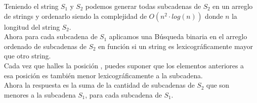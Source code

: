 
Teniendo el string $S_1$ y $S_2$ podemos generar todas subcadenas de $S_2$ en un arreglo de strings y ordenarlo siendo la complejidad de $O(n^2 \cdot log(n))$ donde $n$ la longitud del string $S_2$.\\

Ahora para cada subcadena de $S_1$ aplicamos una Búsqueda binaria en el arreglo ordenado de subcadenas de $S_2$ en función si un string es lexicográficamente mayor que otro string.\\

Cada vez que halles la posición , puedes suponer que los elementos anteriores a esa posición es también menor lexicográficamente a la subcadena.\\

Ahora la respuesta es la suma de la cantidad de subcadenas de $S_2$ que son menores a la subcadena $S_1$, para cada subcadena de $S_1$.

